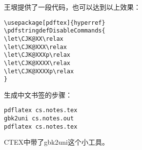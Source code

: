 王垠提供了一段代码，也可以达到以上效果：
\begin{lstlisting}[language=TEX]
\usepackage[pdftex]{hyperref}
\pdfstringdefDisableCommands{
\let\CJK@XX\relax
\let\CJK@XXX\relax
\let\CJK@XXXp\relax
\let\CJK@XXXX\relax
\let\CJK@XXXXp\relax
}
\end{lstlisting}

生成中文书签的步骤：
\begin{lstlisting}
pdflatex cs.notes.tex
gbk2uni cs.notes.out
pdflatex cs.notes.tex
\end{lstlisting}

CTEX中带了gbk2uni这个小工具。

